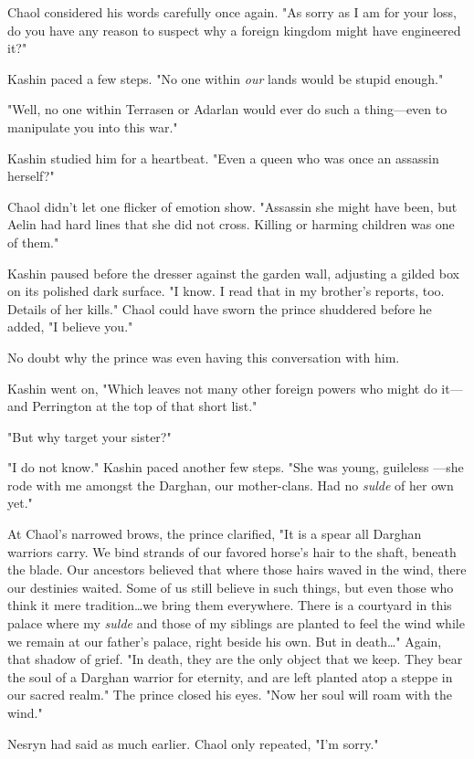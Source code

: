 Chaol considered his words carefully once again. "As sorry as I am for your loss, do you have any reason to suspect why a foreign kingdom might have engineered it?"

Kashin paced a few steps. "No one within \emph{our} lands would be stupid enough."

"Well, no one within Terrasen or Adarlan would ever do such a thing---even to manipulate you into this war."

Kashin studied him for a heartbeat. "Even a queen who was once an assassin herself?"

Chaol didn't let one flicker of emotion show. "Assassin she might have been, but Aelin had hard lines that she did not cross. Killing or harming children was one of them."

Kashin paused before the dresser against the garden wall, adjusting a gilded box on its polished dark surface. "I know. I read that in my brother's reports, too. Details of her kills." Chaol could have sworn the prince shuddered before he added, "I believe you."

No doubt why the prince was even having this conversation with him.

Kashin went on, "Which leaves not many other foreign powers who might do it---and Perrington at the top of that short list."

"But why target your sister?"

"I do not know." Kashin paced another few steps. "She was young, guileless ---she rode with me amongst the Darghan, our mother-clans. Had no \emph{sulde} of her own yet."

At Chaol's narrowed brows, the prince clarified, "It is a spear all Darghan warriors carry. We bind strands of our favored horse's hair to the shaft, beneath the blade. Our ancestors believed that where those hairs waved in the wind, there our destinies waited. Some of us still believe in such things, but even those who think it mere tradition\ldots we bring them everywhere. There is a courtyard in this palace where my \emph{sulde} and those of my siblings are planted to feel the wind while we remain at our father's palace, right beside his own. But in death\ldots" Again, that shadow of grief. "In death, they are the only object that we keep. They bear the soul of a Darghan warrior for eternity, and are left planted atop a steppe in our sacred realm." The prince closed his eyes. "Now her soul will roam with the wind."

Nesryn had said as much earlier. Chaol only repeated, "I'm sorry."

